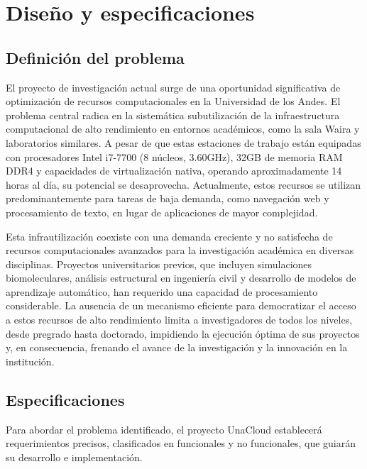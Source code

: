 \section{Diseño y especificaciones}

\subsection{Definición del problema}
El proyecto de investigación actual surge de una oportunidad significativa de optimización de recursos computacionales en la Universidad de los Andes. El problema central radica en la sistemática subutilización de la infraestructura computacional de alto rendimiento en entornos académicos, como la sala Waira y laboratorios similares. A pesar de que estas estaciones de trabajo están equipadas con procesadores Intel i7-7700 (8 núcleos, 3.60GHz), 32GB de memoria RAM DDR4 y capacidades de virtualización nativa, operando aproximadamente 14 horas al día, su potencial se desaprovecha. Actualmente, estos recursos se utilizan predominantemente para tareas de baja demanda, como navegación web y procesamiento de texto, en lugar de aplicaciones de mayor complejidad.

Esta infrautilización coexiste con una demanda creciente y no satisfecha de recursos computacionales avanzados para la investigación académica en diversas disciplinas. Proyectos universitarios previos, que incluyen simulaciones biomoleculares, análisis estructural en ingeniería civil y desarrollo de modelos de aprendizaje automático, han requerido una capacidad de procesamiento considerable. La ausencia de un mecanismo eficiente para democratizar el acceso a estos recursos de alto rendimiento limita a investigadores de todos los niveles, desde pregrado hasta doctorado, impidiendo la ejecución óptima de sus proyectos y, en consecuencia, frenando el avance de la investigación y la innovación en la institución.

\subsection{Especificaciones}
Para abordar el problema identificado, el proyecto UnaCloud establecerá requerimientos precisos, clasificados en funcionales y no funcionales, que guiarán su desarrollo e implementación.

